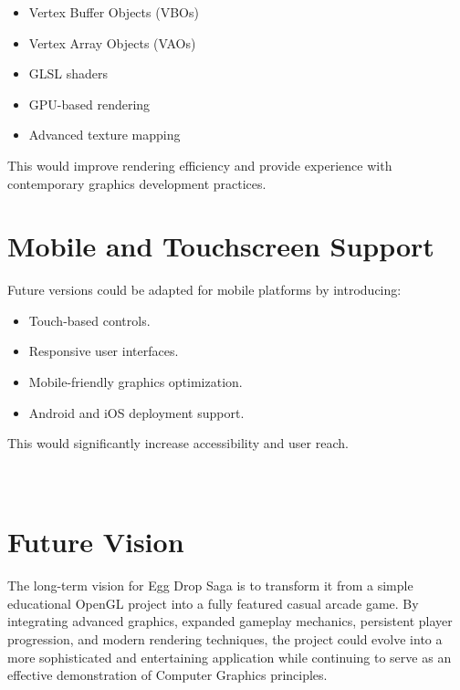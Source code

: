 \documentclass[12pt,a4paper]{report}
\begin{document}
\begin{itemize}
    \item Vertex Buffer Objects (VBOs)
    \item Vertex Array Objects (VAOs)
    \item GLSL shaders
    \item GPU-based rendering
    \item Advanced texture mapping
\end{itemize}

This would improve rendering efficiency and provide experience with contemporary graphics development practices.

\section{Mobile and Touchscreen Support}

Future versions could be adapted for mobile platforms by introducing:

\begin{itemize}
    \item Touch-based controls.
    \item Responsive user interfaces.
    \item Mobile-friendly graphics optimization.
    \item Android and iOS deployment support.
\end{itemize}

This would significantly increase accessibility and user reach. \\ \\ \\ 

\section*{\center Future Vision}

The long-term vision for Egg Drop Saga is to transform it from a simple educational OpenGL project into a fully featured casual arcade game. By integrating advanced graphics, expanded gameplay mechanics, persistent player progression, and modern rendering techniques, the project could evolve into a more sophisticated and entertaining application while continuing to serve as an effective demonstration of Computer Graphics principles.\\ \\
\end{document}

